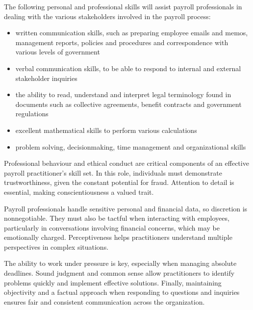 \documentclass[letterpaper,10pt,english]{sphinxmanual}
\begin{document}
\sphinxAtStartPar
The following personal and professional skills will assist payroll professionals in dealing with
the various stakeholders involved in the payroll process:
\begin{itemize}
\item {} 
\sphinxAtStartPar
written communication skills, such as preparing employee emails and memos, management reports, policies and procedures and correspondence with various levels of government

\item {} 
\sphinxAtStartPar
verbal communication skills, to be able to respond to internal and external stakeholder inquiries

\item {} 
\sphinxAtStartPar
the ability to read, understand and interpret legal terminology found in documents such as collective agreements, benefit contracts and government regulations

\item {} 
\sphinxAtStartPar
excellent mathematical skills to perform various calculations

\item {} 
\sphinxAtStartPar
problem solving, decision\sphinxhyphen{}making, time management and organizational skills

\end{itemize}

\sphinxAtStartPar
{}

\sphinxAtStartPar
Professional behaviour and ethical conduct are critical components of an effective payroll practitioner’s skill set. In this
role, individuals must demonstrate trustworthiness, given the constant potential for fraud. Attention to detail is essential,
making conscientiousness a valued trait.

\sphinxAtStartPar
Payroll professionals handle sensitive personal and financial data, so discretion is non\sphinxhyphen{}negotiable. They must also be
tactful when interacting with employees, particularly in conversations involving financial concerns, which may be emotionally
charged. Perceptiveness helps practitioners understand multiple perspectives in complex situations.

\sphinxAtStartPar
The ability to work under pressure is key, especially when managing absolute deadlines. Sound judgment and common sense allow
practitioners to identify problems quickly and implement effective solutions. Finally, maintaining objectivity and a factual
approach when responding to questions and inquiries ensures fair and consistent communication across the organization.
\end{document}
